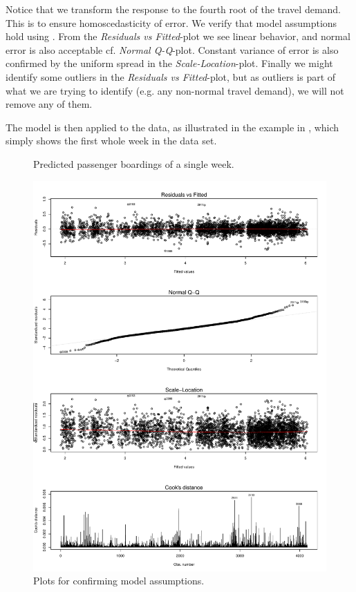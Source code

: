 \documentclass[a4paper,11pt]{article}
\begin{document}
Notice that we transform the response to the fourth root of the travel demand. This is to ensure homoscedasticity of error. We verify that model assumptions hold using . From the \emph{Residuals vs Fitted}-plot we see linear behavior, and normal error is also acceptable cf. \emph{Normal Q-Q}-plot. Constant variance of error is also confirmed by the uniform spread in the \emph{Scale-Location}-plot. Finally we might identify some outliers in the \emph{Residuals vs Fitted}-plot, but as outliers is part of what we are trying to identify (e.g. any non-normal travel demand), we will not remove any of them.

The model is then applied to the data, as illustrated in the example in , which simply shows the first whole week in the data set.
\begin{figure}[!ht]
    \center
    
    \vspace{-1em}
    \caption{Predicted passenger boardings of a single week.}
    \label{fig:travelcard_pred}
\end{figure}

\clearpage
\begin{figure}[!p]
    \center
    \includegraphics[width=\textwidth]{../plots/fit-assumptions}    
    \caption{Plots for confirming model assumptions.}    
    \label{fit-assumptions}
\end{figure}
\clearpage
\end{document}
